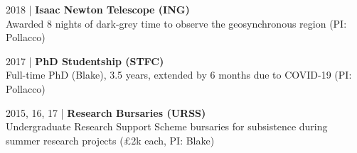 \divider

\small 2018 | \textbf{Isaac Newton Telescope (ING)} \\
Awarded 8 nights of dark-grey time to observe the geosynchronous region (PI: Pollacco)

\divider

\small 2017 | \textbf{PhD Studentship (STFC)} \\
Full-time PhD (Blake), 3.5 years, extended by 6 months due to COVID-19 (PI: Pollacco)

\divider

\small 2015, 16, 17 | \textbf{Research Bursaries (URSS)} \\
Undergraduate Research Support Scheme bursaries for subsistence during summer research projects (£2k each, PI: Blake)
